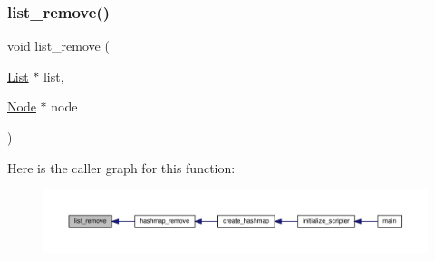\subsubsection{\texorpdfstring{list\+\_\+remove()}{list\_remove()}}
{\footnotesize\ttfamily void list\+\_\+remove (\begin{DoxyParamCaption}\item[{\hyperlink{structList}{List} $\ast$}]{list,  }\item[{\hyperlink{structNode}{Node} $\ast$}]{node }\end{DoxyParamCaption})}

Here is the caller graph for this function\+:
\nopagebreak
\begin{figure}[H]
\begin{center}
\leavevmode
\includegraphics[width=350pt]{linked-list_8h_ad17dd6e2d3e64d3e9665f313ffb808a1_icgraph}
\end{center}
\end{figure}
